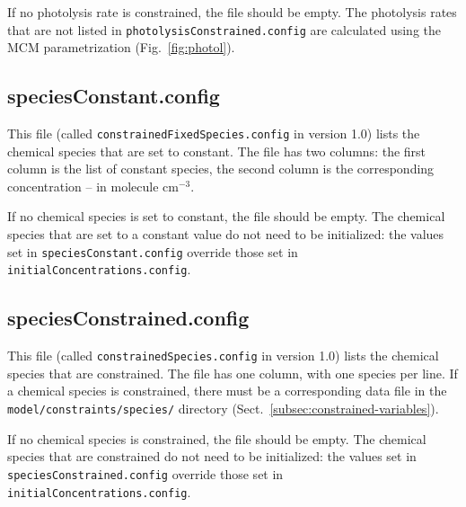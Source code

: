If no photolysis rate is constrained, the file should be empty. The
photolysis rates that are not listed in \texttt{photolysisConstrained.config}
are calculated using the MCM parametrization (Fig.~\ref{fig:photol}).

\subsection{speciesConstant.config} \label{subsec:speciesconstant}

This file (called \texttt{constrainedFixedSpecies.config} in version
1.0) lists the chemical species that are set to constant. The file has
two columns: the first column is the list of constant species, the
second column is the corresponding concentration -- in molecule cm$^{-3}$.

If no chemical species is set to constant, the file should be empty.
The chemical species that are set to a constant value do not need to
be initialized: the values set in \texttt{speciesConstant.config}
override those set in \texttt{initialConcentrations.config}.

\subsection{speciesConstrained.config} \label{subsec:speciesconstrained}

This file (called \texttt{constrainedSpecies.config} in version 1.0)
lists the chemical species that are constrained. The file has one
column, with one species per line. If a chemical species is
constrained, there must be a corresponding data file in the
\texttt{model/constraints/species/} directory
(Sect.~\ref{subsec:constrained-variables}).

If no chemical species is constrained, the file should be empty.  The
chemical species that are constrained do not need to be initialized:
the values set in \texttt{speciesConstrained.config} override those
set in \texttt{initialConcentrations.config}.
